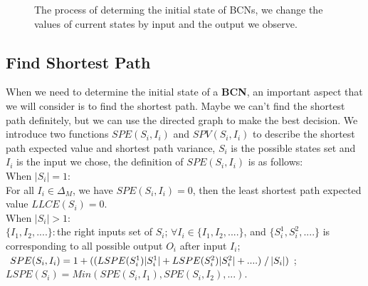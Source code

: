 \documentclass[letterpaper, 10 pt, conference]{ieeeconf}  %
\begin{document}
\begin{figure}[thpb]
      \centering
      
      \caption{The process of determing the initial state of BCNs, we change the values of current states by input and the output we observe. }
      \label{fig:5}
   \end{figure}

\subsection{Find Shortest Path}
When we need to determine the initial state of a {\bf BCN}, an important aspect that we will consider is to find the shortest path. Maybe we can't find the shortest path definitely, but we can use the directed graph to make the best decision. We introduce two functions $SPE(S_i, I_i)$ and $SPV(S_i, I_i)$ to describe the shortest path expected value and shortest path variance, $S_i$ is the possible states set and $I_i$ is the input we chose, the definition of $SPE(S_i, I_i)$ is as follows:\\
When $|S_i|=1$:\\ 
For all $I_i \in \Delta_M$, we have $SPE(S_i, I_i)=0$, then the least shortest path  expected value $LLCE(S_i)= 0$. \\
When $|S_i|>1$:\\ 
$\{I_1,I_2,....\}$:\,the right inputs set of $S_i$; $\forall I_i \in \{I_1,I_2,....\}$, and $\{S_i^1,S_i^2,....\}$ is corresponding to all possible output $O_i$ after input $I_i$; $SPE(S_i, I_i)=1 +( (LSPE(S_i^1)|S_i^1|+LSPE(S_i^2)|S_i^2|+....)\left. \right/ |S_i|)$; $LSPE(S_i)= Min(SPE(S_i, I_1),SPE(S_i, I_2),...)$.
\end{document}
